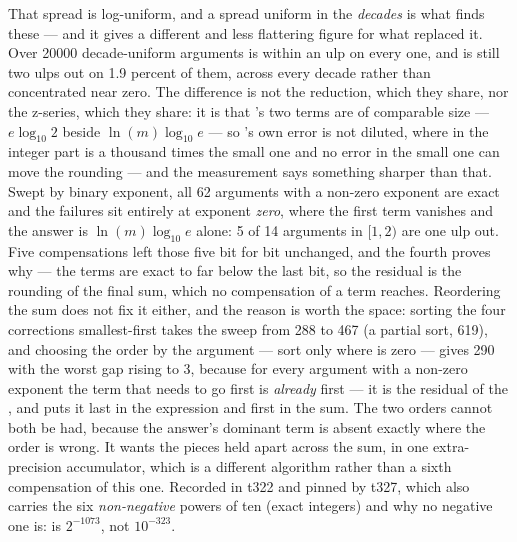 \begin{description}[style=nextline,leftmargin=5.2em]
    That spread is log-uniform, and a spread uniform in the \emph{decades} is
    what finds these --- and it gives a different and less flattering figure for
    what replaced it. Over \num{20000} decade-uniform arguments  is
    within an ulp on every one, and  is still two ulps out on
    \num{1.9} percent of them, across every decade rather than concentrated near
    zero. The difference is not the reduction, which they share, nor the
    z-series, which they share: it is that 's two terms are of
    comparable size --- $e\log_{10}2$ beside $\ln(m)\log_{10}e$ --- so
    's own error is not diluted, where in  the integer part is
    a thousand times the small one and no error in the small one can move the
    rounding --- and the measurement says something sharper than that. Swept by
    binary exponent, all 62 arguments with a non-zero exponent are exact and the
    failures sit entirely at exponent \emph{zero}, where the first term vanishes
    and the answer is $\ln(m)\log_{10}e$ alone: 5 of 14 arguments in $[1,2)$ are
    one ulp out. Five compensations left those five bit for bit unchanged, and the
    fourth proves why --- the terms are exact to far below the last bit, so the
    residual is the rounding of the final sum, which no compensation of a term
    reaches. Reordering the sum does not fix it either, and the reason is worth
    the space: sorting the four corrections smallest-first takes the sweep from
    \num{288} to \num{467} (a partial sort, \num{619}), and choosing the order by
    the argument --- sort only where  is zero --- gives \num{290} with the
    worst gap rising to 3, because for
    every argument with a non-zero exponent the term that needs to go first is
    \emph{already} first --- it is the residual of the , and
     puts it last in the expression and first in the sum. The two
    orders cannot both be had, because the answer's dominant term is absent exactly
    where the order is wrong. It wants the pieces held apart across the sum, in
    one extra-precision accumulator, which is a different algorithm rather than a
    sixth compensation of this one. Recorded in t322 and
    pinned by t327, which also carries the six \emph{non-negative} powers of ten
    (exact integers) and why no negative one is:  is $2^{-1073}$, not
    $10^{-323}$.


\end{description}
